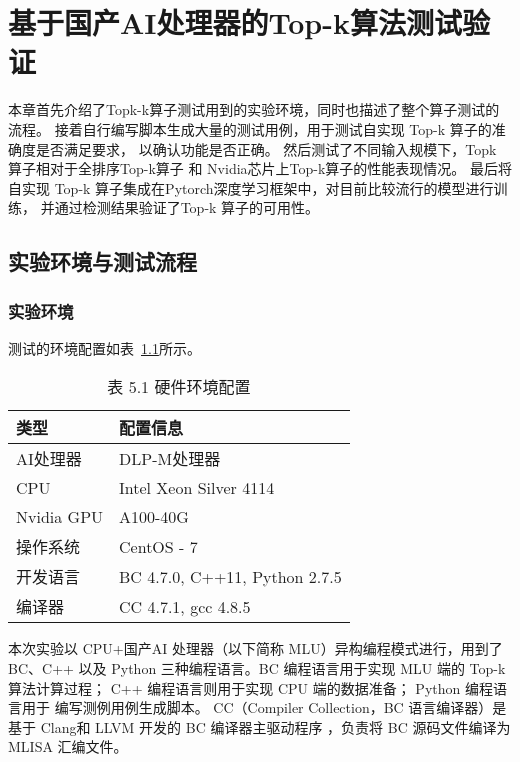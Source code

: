 \chapter{基于国产AI处理器的Top-k算法测试验证}

本章首先介绍了Topk-k算子测试用到的实验环境，同时也描述了整个算子测试的流程。
接着自行编写脚本生成大量的测试用例，用于测试自实现 Top-k 算子的准确度是否满足要求，
以确认功能是否正确。
然后测试了不同输入规模下，Topk 算子相对于全排序Top-k算子 和 Nvidia芯片上Top-k算子的性能表现情况。
最后将自实现
 Top-k 算子集成在Pytorch深度学习框架中，对目前比较流行的模型进行训练，
 并通过检测结果验证了Top-k 算子的可用性。

\section{实验环境与测试流程}
\subsection{实验环境}

测试的环境配置如表~\ref{tab:peizhi}所示。
\begin{table}[h]
    \centering
    \caption{表 5.1 硬件环境配置}
    \begin{tabular}{|l|l|}
    \hline
    类型 & 配置信息 \\
    \hline
    AI处理器 & DLP-M处理器 \\
    \hline
    CPU & Intel Xeon Silver 4114 \\
    \hline
    Nvidia GPU & A100-40G \\
    \hline
    操作系统 & CentOS - 7 \\
    \hline
    开发语言 & BC 4.7.0, C++11, Python 2.7.5 \\
    \hline
    编译器 & CC 4.7.1, gcc 4.8.5 \\
    \hline
    \end{tabular}
    \label{tab:peizhi}
    \end{table}
    
    本次实验以 CPU+国产AI 处理器（以下简称 MLU）异构编程模式进行，用到了BC、C++ 以及 Python 
    三种编程语言。BC 编程语言用于实现 MLU 端的 Top-k 算法计算过程；
    C++ 编程语言则用于实现 CPU 端的数据准备；
    Python 编程语言用于 编写测例用例生成脚本。
    CC（Compiler Collection，BC 语言编译器）是基于 Clang和 LLVM 开发的 BC 编译器主驱动程序
    ，负责将 BC 源码文件编译为 MLISA 汇编文件。
    

